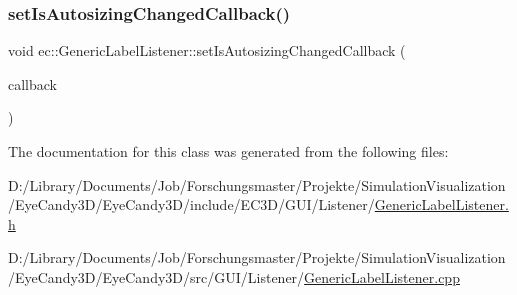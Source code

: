 \mbox{\label{classec_1_1_generic_label_listener_a3141f73b5396a6a57b81159619ada6db}} 
\subsubsection{\texorpdfstring{set\+Is\+Autosizing\+Changed\+Callback()}{setIsAutosizingChangedCallback()}}
{\footnotesize\ttfamily void ec\+::\+Generic\+Label\+Listener\+::set\+Is\+Autosizing\+Changed\+Callback (\begin{DoxyParamCaption}\item[{const \mbox{\hyperlink{classec_1_1_generic_label_listener_adf4cec1bd13682ce66c52f0484fe46c6}{Is\+Autosizing\+Changed\+\_\+\+Callback}} \&}]{callback }\end{DoxyParamCaption})}



The documentation for this class was generated from the following files\+:\begin{DoxyCompactItemize}
\item 
D\+:/\+Library/\+Documents/\+Job/\+Forschungsmaster/\+Projekte/\+Simulation\+Visualization/\+Eye\+Candy3\+D/\+Eye\+Candy3\+D/include/\+E\+C3\+D/\+G\+U\+I/\+Listener/\mbox{\hyperlink{_generic_label_listener_8h}{Generic\+Label\+Listener.\+h}}\item 
D\+:/\+Library/\+Documents/\+Job/\+Forschungsmaster/\+Projekte/\+Simulation\+Visualization/\+Eye\+Candy3\+D/\+Eye\+Candy3\+D/src/\+G\+U\+I/\+Listener/\mbox{\hyperlink{_generic_label_listener_8cpp}{Generic\+Label\+Listener.\+cpp}}\end{DoxyCompactItemize}

